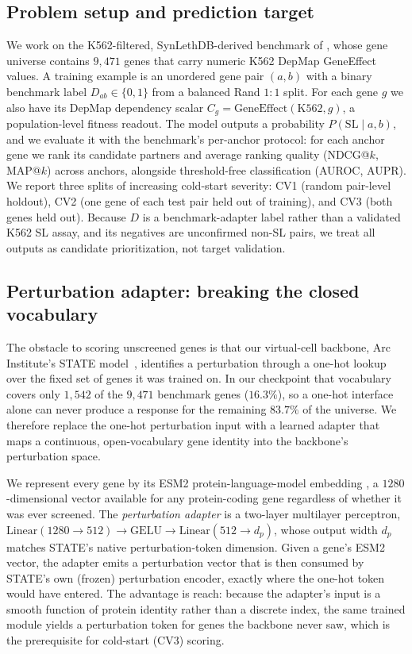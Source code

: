 \subsection{Problem setup and prediction target}
\label{sec:setup}

We work on the K562-filtered, SynLethDB-derived benchmark of
\citet{feng2024benchmarking}, whose gene universe contains $9{,}471$ genes that
carry numeric K562 DepMap GeneEffect values. A training example is an unordered
gene pair $(a,b)$ with a binary benchmark label $D_{ab}\in\{0,1\}$ from a
balanced Rand $1{:}1$ split. For each gene $g$ we also have its DepMap
dependency scalar $C_g=\mathrm{GeneEffect}(\text{K562},g)$, a population-level
fitness readout. The model outputs a probability $P(\mathrm{SL}\mid a,b)$, and we
evaluate it with the benchmark's per-anchor protocol: for each anchor gene we
rank its candidate partners and average ranking quality (NDCG@$k$, MAP@$k$)
across anchors, alongside threshold-free classification (AUROC, AUPR). We report
three splits of increasing cold-start severity: CV1 (random pair-level holdout),
CV2 (one gene of each test pair held out of training), and CV3 (both genes held
out). Because $D$ is a benchmark-adapter label rather than a validated K562 SL
assay, and its negatives are unconfirmed non-SL pairs, we treat all outputs as
candidate prioritization, not target validation.

\subsection{Perturbation adapter: breaking the closed vocabulary}
\label{sec:adapter}

The obstacle to scoring unscreened genes is that our virtual-cell backbone,
Arc Institute's STATE model~\citep{adduri2025state}, identifies a perturbation
through a one-hot lookup over the fixed set of genes it was trained on. In our
checkpoint that vocabulary covers only $1{,}542$ of the $9{,}471$ benchmark
genes ($16.3\%$), so a one-hot interface alone can never produce a response for
the remaining $83.7\%$ of the universe. We therefore replace the one-hot
perturbation input with a learned adapter that maps a continuous, open-vocabulary
gene identity into the backbone's perturbation space.

We represent every gene by its ESM2 protein-language-model embedding
\citep{lin2023esm2}, a $1280$-dimensional vector available for any protein-coding
gene regardless of whether it was ever screened. The \emph{perturbation adapter}
is a two-layer multilayer perceptron, $\mathrm{Linear}(1280\!\to\!512)\to
\mathrm{GELU}\to\mathrm{Linear}(512\!\to\!d_p)$, whose output width $d_p$ matches
STATE's native perturbation-token dimension. Given a gene's ESM2 vector, the
adapter emits a perturbation vector that is then consumed by STATE's own (frozen)
perturbation encoder, exactly where the one-hot token would have entered. The
advantage is reach: because the adapter's input is a smooth function of protein
identity rather than a discrete index, the same trained module yields a
perturbation token for genes the backbone never saw, which is the prerequisite
for cold-start (CV3) scoring.

